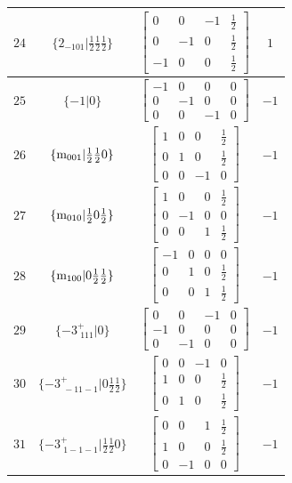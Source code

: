 \documentclass[fleqn,8pt]{jsarticle}
\begin{document}
\begin{longtable}{cccc}
$ 24 $ & $ \{2{}_{-101}|\frac{1}{2} \frac{1}{2} \frac{1}{2}\} $ & $ \begin{bmatrix} 0 & 0 & -1 & \frac{1}{2} \\ 0 & -1 & 0 & \frac{1}{2} \\ -1 & 0 & 0 & \frac{1}{2} \end{bmatrix} $ & $ 1 $ \\ \hline
$ 25 $ & $ \{-1|0\} $ & $ \begin{bmatrix} -1 & 0 & 0 & 0 \\ 0 & -1 & 0 & 0 \\ 0 & 0 & -1 & 0 \end{bmatrix} $ & $ -1 $ \\ \hline
$ 26 $ & $ \{{\rm m}_{001}|\frac{1}{2} \frac{1}{2} 0\} $ & $ \begin{bmatrix} 1 & 0 & 0 & \frac{1}{2} \\ 0 & 1 & 0 & \frac{1}{2} \\ 0 & 0 & -1 & 0 \end{bmatrix} $ & $ -1 $ \\ \hline
$ 27 $ & $ \{{\rm m}_{010}|\frac{1}{2} 0 \frac{1}{2}\} $ & $ \begin{bmatrix} 1 & 0 & 0 & \frac{1}{2} \\ 0 & -1 & 0 & 0 \\ 0 & 0 & 1 & \frac{1}{2} \end{bmatrix} $ & $ -1 $ \\ \hline
$ 28 $ & $ \{{\rm m}_{100}|0 \frac{1}{2} \frac{1}{2}\} $ & $ \begin{bmatrix} -1 & 0 & 0 & 0 \\ 0 & 1 & 0 & \frac{1}{2} \\ 0 & 0 & 1 & \frac{1}{2} \end{bmatrix} $ & $ -1 $ \\ \hline
$ 29 $ & $ \{-3^{+}_{\,\,111}|0\} $ & $ \begin{bmatrix} 0 & 0 & -1 & 0 \\ -1 & 0 & 0 & 0 \\ 0 & -1 & 0 & 0 \end{bmatrix} $ & $ -1 $ \\ \hline
$ 30 $ & $ \{-3^{+}_{\,\,-11-1}|0 \frac{1}{2} \frac{1}{2}\} $ & $ \begin{bmatrix} 0 & 0 & -1 & 0 \\ 1 & 0 & 0 & \frac{1}{2} \\ 0 & 1 & 0 & \frac{1}{2} \end{bmatrix} $ & $ -1 $ \\ \hline
$ 31 $ & $ \{-3^{+}_{\,\,1-1-1}|\frac{1}{2} \frac{1}{2} 0\} $ & $ \begin{bmatrix} 0 & 0 & 1 & \frac{1}{2} \\ 1 & 0 & 0 & \frac{1}{2} \\ 0 & -1 & 0 & 0 \end{bmatrix} $ & $ -1 $ \\ \hline

\end{longtable}
\end{document}
